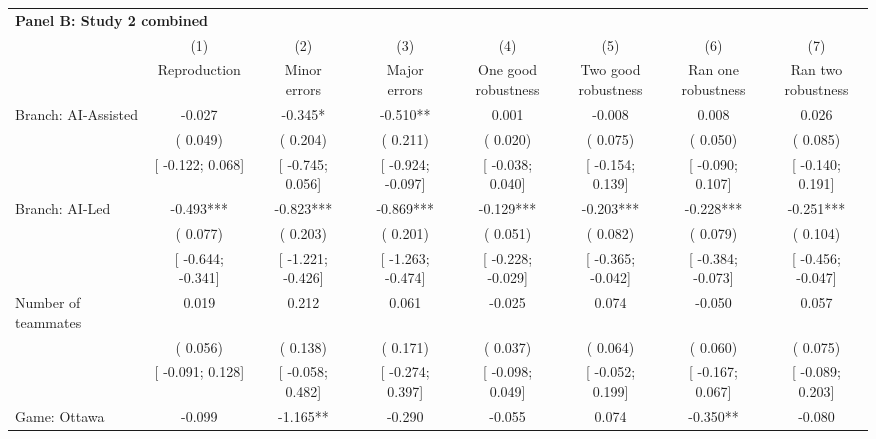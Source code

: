 \def\sym#1{\ifmmode^{#1}\else\(^{#1}\)\fi}
\begin{tabular}{l*{7}{c}}
\hline\hline
\multicolumn{8}{l}{\textbf{Panel B: Study 2 combined}}\\
& (1) & (2) & (3) & (4) & (5) & (6) & (7)\\
                    &Reproduction   &\shortstack[c]{Minor\\errors}   &\shortstack[c]{Major\\errors}   &\shortstack[c]{One good\\robustness}   &\shortstack[c]{Two good\\robustness}   &\shortstack[c]{Ran one\\robustness}   &\shortstack[c]{Ran two\\robustness}   \\
\hline
Branch: AI-Assisted &   -0.027   &   -0.345*   &   -0.510**   &    0.001   &   -0.008   &    0.008   &    0.026   \\
                    &(    0.049)   &(    0.204)   &(    0.211)   &(    0.020)   &(    0.075)   &(    0.050)   &(    0.085)   \\
                    &[   -0.122;     0.068]   &[   -0.745;     0.056]   &[   -0.924;    -0.097]   &[   -0.038;     0.040]   &[   -0.154;     0.139]   &[   -0.090;     0.107]   &[   -0.140;     0.191]   \\
Branch: AI-Led &   -0.493***   &   -0.823***   &   -0.869***   &   -0.129***   &   -0.203***   &   -0.228***   &   -0.251***   \\
                    &(    0.077)   &(    0.203)   &(    0.201)   &(    0.051)   &(    0.082)   &(    0.079)   &(    0.104)   \\
                    &[   -0.644;    -0.341]   &[   -1.221;    -0.426]   &[   -1.263;    -0.474]   &[   -0.228;    -0.029]   &[   -0.365;    -0.042]   &[   -0.384;    -0.073]   &[   -0.456;    -0.047]   \\
Number of teammates &    0.019   &    0.212   &    0.061   &   -0.025   &    0.074   &   -0.050   &    0.057   \\
                    &(    0.056)   &(    0.138)   &(    0.171)   &(    0.037)   &(    0.064)   &(    0.060)   &(    0.075)   \\
                    &[   -0.091;     0.128]   &[   -0.058;     0.482]   &[   -0.274;     0.397]   &[   -0.098;     0.049]   &[   -0.052;     0.199]   &[   -0.167;     0.067]   &[   -0.089;     0.203]   \\
Game: Ottawa &   -0.099   &   -1.165**   &   -0.290   &   -0.055   &    0.074   &   -0.350**   &   -0.080   \\

\end{tabular}
